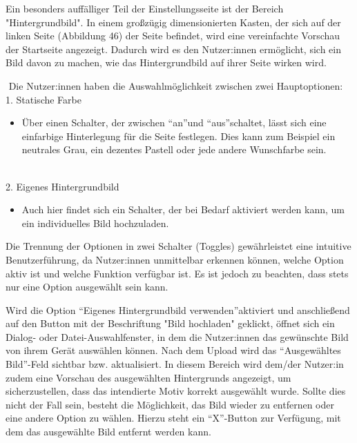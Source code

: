 Ein besonders auffälliger Teil der Einstellungsseite ist der Bereich "Hintergrundbild". In einem großzügig dimensionierten Kasten, der sich auf der linken Seite (Abbildung 46) der Seite befindet, wird eine vereinfachte Vorschau der Startseite angezeigt. Dadurch wird es den Nutzer:innen ermöglicht, sich ein Bild davon zu machen, wie das Hintergrundbild auf ihrer Seite wirken wird.

 Die Nutzer:innen haben die Auswahlmöglichkeit zwischen zwei Hauptoptionen:
\\
1. Statische Farbe
\begin{itemize}
    \item Über einen Schalter, der zwischen \textquotedblleft an\textquotedblright und \textquotedblleft aus\textquotedblright schaltet, lässt sich eine einfarbige Hinterlegung für die Seite festlegen. Dies kann zum Beispiel ein neutrales Grau, ein dezentes Pastell oder jede andere Wunschfarbe sein.
\end{itemize}
\\
2. Eigenes Hintergrundbild
\begin{itemize}
    \item Auch hier findet sich ein Schalter, der bei Bedarf aktiviert werden kann, um ein individuelles Bild hochzuladen.
\end{itemize}

Die Trennung der Optionen in zwei Schalter (Toggles) gewährleistet eine intuitive Benutzerführung, da Nutzer:innen unmittelbar erkennen können, welche Option aktiv ist und welche Funktion verfügbar ist. Es ist jedoch zu beachten, dass stets nur eine Option ausgewählt sein kann.

Wird die Option \textquotedblleft Eigenes Hintergrundbild verwenden\textquotedblright aktiviert und anschließend auf den Button mit der Beschriftung "Bild hochladen" geklickt, öffnet sich ein Dialog- oder Datei-Auswahlfenster, in dem die Nutzer:innen das gewünschte Bild von ihrem Gerät auswählen können.
Nach dem Upload wird das \textquotedblleft Ausgewähltes Bild\textquotedblright-Feld sichtbar bzw. aktualisiert. In diesem Bereich wird dem/der Nutzer:in zudem eine Vorschau des ausgewählten Hintergrunds angezeigt, um sicherzustellen, dass das intendierte Motiv korrekt ausgewählt wurde. Sollte dies nicht der Fall sein, besteht die Möglichkeit, das Bild wieder zu entfernen oder eine andere Option zu wählen. Hierzu steht ein \textquotedblleft X\textquotedblright-Button zur Verfügung, mit dem das ausgewählte Bild entfernt werden kann.


